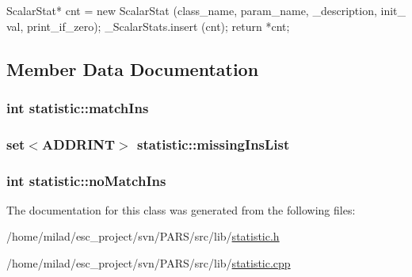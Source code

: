 \begin{DoxyCode}
                                                                                 
                                                                  {
    ScalarStat* cnt = new ScalarStat (class_name, param_name, _description, init_
      val, print_if_zero);
    _ScalarStats.insert (cnt);
    return *cnt;
}
\end{DoxyCode}


\subsection{Member Data Documentation}
\hypertarget{classstatistic_a5454149fac41c264c14ed73694a7c4e4}{
\subsubsection[{matchIns}]{\setlength{\rightskip}{0pt plus 5cm}int {\bf statistic::matchIns}}}
\label{classstatistic_a5454149fac41c264c14ed73694a7c4e4}
\hypertarget{classstatistic_aed69957ac20a00f832a0b01f37029faa}{
\subsubsection[{missingInsList}]{\setlength{\rightskip}{0pt plus 5cm}set$<$ADDRINT$>$ {\bf statistic::missingInsList}}}
\label{classstatistic_aed69957ac20a00f832a0b01f37029faa}
\hypertarget{classstatistic_ab87dfd0301135bd8385c390e21fd1034}{
\subsubsection[{noMatchIns}]{\setlength{\rightskip}{0pt plus 5cm}int {\bf statistic::noMatchIns}}}
\label{classstatistic_ab87dfd0301135bd8385c390e21fd1034}


The documentation for this class was generated from the following files:\begin{DoxyCompactItemize}
\item 
/home/milad/esc\_\-project/svn/PARS/src/lib/\hyperlink{statistic_8h}{statistic.h}\item 
/home/milad/esc\_\-project/svn/PARS/src/lib/\hyperlink{statistic_8cpp}{statistic.cpp}\end{DoxyCompactItemize}
